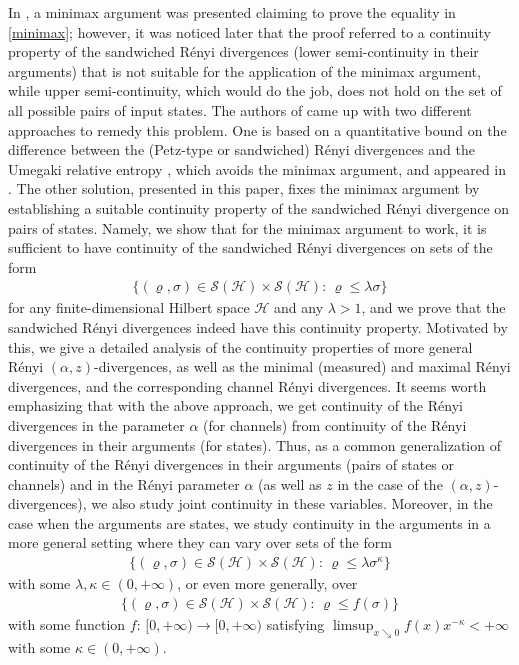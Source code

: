 \documentclass[unsortedaddress,superscriptaddress,pra,notitlepage]{revtex4}
\def\S{{\mathcal S}}
\def\rho{\varrho}
\def\hil{{\mathcal H}}
\def\pwr{\kappa}
\begin{document}
In \cite[Lemma 10]{CMW}, a minimax argument was presented claiming to prove the equality in \eqref{minimax}; however, it was
noticed later \cite{BDS2021} that the proof referred to a continuity property of the sandwiched R\'enyi divergences
(lower semi-continuity in their arguments) that is not suitable for the application of the minimax argument,
while upper semi-continuity,
which would do the job, does not hold on the set of all possible pairs of input states. 
The authors of \cite{CMW} came up with 
two different approaches to remedy this problem. One is based on a quantitative 
bound on the difference between the (Petz-type or sandwiched) R\'enyi divergences and the Umegaki relative entropy \cite{TCR2009,TomamichelPhD}, which avoids the minimax argument, and appeared in \cite[Appendix B]{Dingetal2020}.
The other solution, presented in this paper, fixes the minimax argument by establishing 
a suitable continuity property of the sandwiched R\'enyi divergence on pairs of states. 
Namely, we show that for the minimax argument to work, it is sufficient to have continuity of the sandwiched R\'enyi divergences on sets of the form 
\begin{align}\label{S lambda}
\{(\rho,\sigma)\in\S(\hil)\times\S(\hil):\,\rho\le\lambda\sigma\}
\end{align}
for any finite-dimensional Hilbert space $\hil$ and any $\lambda>1$, and we prove that 
the sandwiched R\'enyi divergences indeed have this continuity property.
Motivated by this, we give a detailed analysis of the continuity properties
of more general R\'enyi $(\alpha,z)$-divergences, as well as the minimal (measured) and maximal R\'enyi divergences, and the corresponding channel R\'enyi divergences. 
It seems worth emphasizing that with the above approach, we get continuity
of the R\'enyi divergences in the parameter $\alpha$
(for channels) from continuity of the R\'enyi divergences in their arguments (for states).
Thus, as a common generalization of continuity of 
the R\'enyi divergences 
in their arguments (pairs of states or channels) and in the R\'enyi parameter $\alpha$
(as well as $z$ in the case of the $(\alpha,z)$-divergences), 
we also study joint continuity in these variables.
Moreover, in the case when the arguments are states, we 
study continuity in the arguments in a more general setting where they 
can vary over sets of the form 
\begin{align}\label{S lambda2}
\{(\rho,\sigma)\in\S(\hil)\times\S(\hil):\,\rho\le\lambda\sigma^{\pwr}\}
\end{align}
with some $\lambda,\pwr\in(0,+\infty)$, or even more generally, over
\begin{align}\label{S lambda3}
\{(\rho,\sigma)\in\S(\hil)\times\S(\hil):\,\rho\le f(\sigma)\}
\end{align}
with some function $f:\,[0,+\infty)\to[0,+\infty)$ satisfying
$\limsup_{x\searrow 0}f(x)x^{-\kappa}<+\infty$ with some 
$\kappa\in(0,+\infty)$. 
\end{document}
